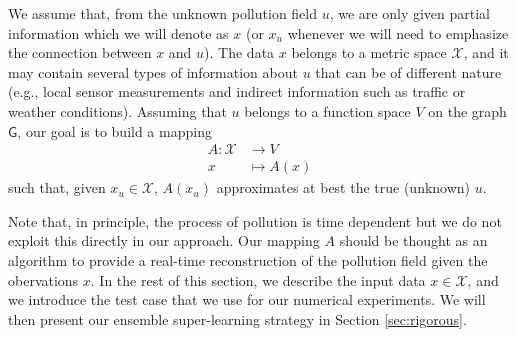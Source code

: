 \documentclass[11pt,a4paper,twoside]{article}
\theoremstyle{definition}
\numberwithin{equation}{section}
\newcommand{\cX}{\ensuremath{\mathcal{X}}}
\newcommand{\G}{\ensuremath{\textsf{G}}} %
\newcommand{\<}{\langle}
\renewcommand{\>}{\rangle}
\begin{document}
We assume that, from the unknown pollution field $u$, we are only given partial information which we will denote as $x$ (or $x_u$ whenever we will need to emphasize the connection between $x$ and $u$). The data $x$ belongs to a metric space $\cX$, and it may contain several types of information about $u$ that can be of different nature (e.g., local sensor measurements and indirect information such as traffic or weather conditions). Assuming that $u$ belongs to a function space $V$ on the graph $\G$, our goal is to build a mapping
\begin{align*}
A: \cX &\to V \\
x &\mapsto A(x)
\end{align*}
such that, given $x_u\in \cX$, $A(x_u)$ approximates at best the true (unknown) $u$.

Note that, in  principle, the process of pollution is time dependent but we do not exploit this directly in our approach. Our mapping $A$ should be thought as an algorithm to provide a real-time reconstruction of the pollution field given the obervations $x$. In the rest of this section, we describe the input data $x\in \cX$, and we introduce the test case that we use for our numerical experiments. We will then present our ensemble super-learning strategy in Section \ref{sec:rigorous}.

\end{document}
